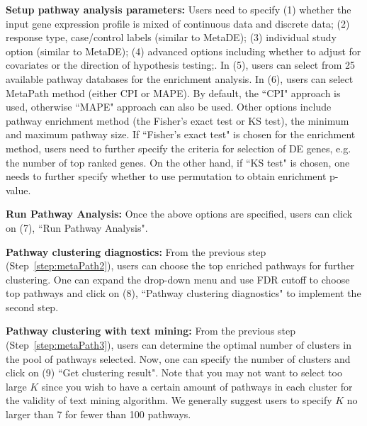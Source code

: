 \begin{steps}
\item \textbf{Setup pathway analysis parameters:}
Users need to specify {\color{red}(1) } whether the input gene expression profile is mixed of continuous data and discrete data;
{\color{red}(2)} response type, case/control labels (similar to MetaDE);
{\color{red}(3)} individual study option (similar to MetaDE);
{\color{red}(4)} advanced options including whether to adjust for covariates or the direction of hypothesis testing;.
In {\color{red}(5)}, users can select from 25 available pathway databases for the enrichment analysis.
In {\color{red}(6)}, users can select MetaPath method (either CPI or MAPE).
By default, the ``CPI" approach is used, otherwise ``MAPE" approach can also be used. Other options include pathway enrichment method (the Fisher's exact test or KS test), the minimum and maximum pathway size. If ``Fisher's exact test" is chosen for the enrichment method, users need to further specify the criteria for selection of DE genes, e.g. the number of top ranked genes. On the other hand, if ``KS test" is chosen, one needs to further specify whether to use permutation to obtain enrichment p-value. 

\item \textbf{Run Pathway Analysis:}
\label{step:metaPath1}
Once the above options are specified, users can click on {\color{red}(7)}, ``Run Pathway Analysis".

\textbf{Pathway clustering diagnostics:} 
\label{step:metaPath2}
From the previous step (Step~\ref{step:metaPath2}), users can choose the top enriched pathways for further clustering. 
One can expand the drop-down menu and use FDR cutoff to choose top pathways and click on {\color{red}(8)}, ``Pathway clustering diagnostics" to implement the second step.

\textbf{Pathway clustering with text mining:} 
\label{step:metaPath3}
From the previous step (Step~\ref{step:metaPath3}), users can determine the optimal number of clusters in the pool of pathways selected. 
Now, one can specify the number of clusters and click on {\color{red}(9)} ``Get clustering result". 
Note that you may not want to select too large $K$ since you wish to have a certain amount of pathways in each cluster for the validity of text mining algorithm. 
We generally suggest users to specify $K$ no larger than 7 for fewer than 100 pathways. 
\end{steps}





